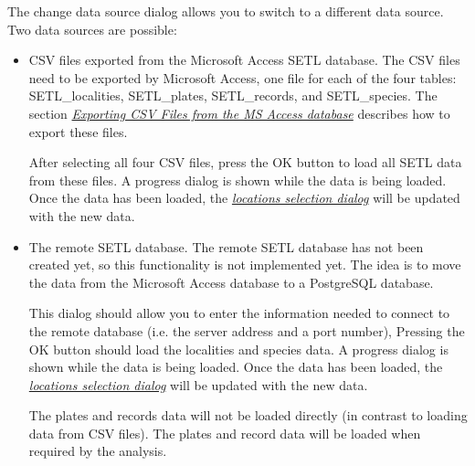 \documentclass[letterpaper,10pt,english]{sphinxmanual}
\begin{document}
The change data source dialog allows you to switch to a different data
source. Two data sources are possible:
\begin{itemize}
\item {} 
CSV files exported from the Microsoft Access SETL database. The CSV
files need to be exported by Microsoft Access, one file for each of
the four tables: SETL\_localities, SETL\_plates, SETL\_records, and
SETL\_species. The section
{\hyperref[user_manual:export-csv-msaccess]{\emph{Exporting CSV Files from the MS Access database}}}
describes how to export these files.

After selecting all four CSV files, press the OK button to load all
SETL data from these files. A progress dialog is shown while the data
is being loaded. Once the data has been loaded, the
{\hyperref[user_manual:dialog-loc-selection]{\emph{locations selection dialog}}} will be
updated with the new data.

\item {} 
The remote SETL database. The remote SETL database has not been
created yet, so this functionality is not implemented yet. The idea is
to move the data from the Microsoft Access database to a PostgreSQL
database.

This dialog should allow you to enter the information needed to
connect to the remote database (i.e. the server address and a port number),
Pressing the OK button should load the localities and species data.
A progress dialog is shown while the data is being loaded. Once the
data has been loaded, the
{\hyperref[user_manual:dialog-loc-selection]{\emph{locations selection dialog}}} will be
updated with the new data.

The plates and records data will not be loaded directly (in contrast
to loading data from CSV files). The plates and record data will be
loaded when required by the analysis.

\end{itemize}
\end{document}
